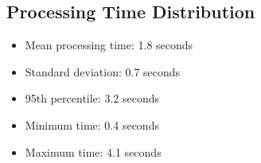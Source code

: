 \documentclass[12pt,a4paper]{report}
\begin{document}
\subsection{Processing Time Distribution}
\begin{itemize}
    \item Mean processing time: 1.8 seconds
    \item Standard deviation: 0.7 seconds
    \item 95th percentile: 3.2 seconds
    \item Minimum time: 0.4 seconds
    \item Maximum time: 4.1 seconds
\end{itemize}
\end{document}
